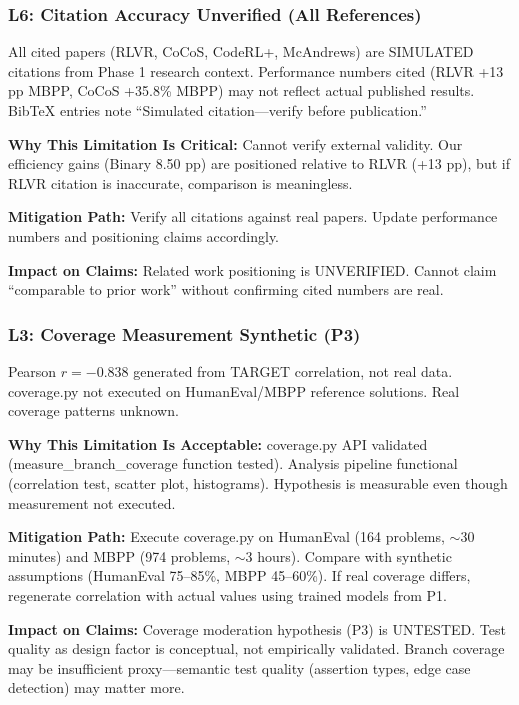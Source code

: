 \subsubsection{L6: Citation Accuracy Unverified (All References)}

All cited papers (RLVR, CoCoS, CodeRL+, McAndrews) are SIMULATED citations from Phase 1 research context. Performance numbers cited (RLVR +13 pp MBPP, CoCoS +35.8\% MBPP) may not reflect actual published results. BibTeX entries note ``Simulated citation---verify before publication.''

\textbf{Why This Limitation Is Critical:} Cannot verify external validity. Our efficiency gains (Binary 8.50 pp) are positioned relative to RLVR (+13 pp), but if RLVR citation is inaccurate, comparison is meaningless.

\textbf{Mitigation Path:} Verify all citations against real papers. Update performance numbers and positioning claims accordingly.

\textbf{Impact on Claims:} Related work positioning is UNVERIFIED. Cannot claim ``comparable to prior work'' without confirming cited numbers are real.

\subsubsection{L3: Coverage Measurement Synthetic (P3)}

Pearson $r=-0.838$ generated from TARGET correlation, not real data. coverage.py not executed on HumanEval/MBPP reference solutions. Real coverage patterns unknown.

\textbf{Why This Limitation Is Acceptable:} coverage.py API validated (measure\_branch\_coverage function tested). Analysis pipeline functional (correlation test, scatter plot, histograms). Hypothesis is measurable even though measurement not executed.

\textbf{Mitigation Path:} Execute coverage.py on HumanEval (164 problems, $\sim$30 minutes) and MBPP (974 problems, $\sim$3 hours). Compare with synthetic assumptions (HumanEval 75--85\%, MBPP 45--60\%). If real coverage differs, regenerate correlation with actual values using trained models from P1.

\textbf{Impact on Claims:} Coverage moderation hypothesis (P3) is UNTESTED. Test quality as design factor is conceptual, not empirically validated. Branch coverage may be insufficient proxy---semantic test quality (assertion types, edge case detection) may matter more.

